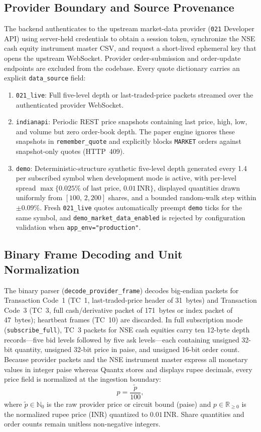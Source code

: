 \documentclass[journal,onecolumn,10pt]{IEEEtran}
\newcommand{\thinunit}[2]{#1\,\text{#2}}
\begin{document}
\subsection{Provider Boundary and Source Provenance}
The backend authenticates to the upstream market-data provider (\texttt{021} Developer API) using server-held credentials to obtain a session token, synchronize the NSE cash equity instrument master CSV, and request a short-lived ephemeral key that opens the upstream WebSocket. Provider order-submission and order-update endpoints are excluded from the codebase. Every quote dictionary carries an explicit \texttt{data\_source} field:
\begin{enumerate}
  \item \texttt{021\_live}: Full five-level depth or last-traded-price packets streamed over the authenticated provider WebSocket.
  \item \texttt{indianapi}: Periodic REST price snapshots containing last price, high, low, and volume but zero order-book depth. The paper engine ignores these snapshots in \texttt{remember\_quote} and explicitly blocks \texttt{MARKET} orders against snapshot-only quotes (HTTP~409).
  \item \texttt{demo}: Deterministic-structure synthetic five-level depth generated every \thinunit{1.4}{s} per subscribed symbol when development mode is active, with per-level spread $\max\{0.025\%\text{ of last price},\,\thinunit{0.01}{INR}\}$, displayed quantities drawn uniformly from $[100,\,2{,}200]$ shares, and a bounded random-walk step within $\pm 0.09\%$. Fresh \texttt{021\_live} quotes automatically preempt \texttt{demo} ticks for the same symbol, and \texttt{demo\_market\_data\_enabled} is rejected by configuration validation when \texttt{app\_env="production"}.
\end{enumerate}

\subsection{Binary Frame Decoding and Unit Normalization}
The binary parser (\texttt{decode\_provider\_frame}) decodes big-endian packets for Transaction Code~1 (TC~1, last-traded-price header of 31~bytes) and Transaction Code~3 (TC~3, full cash/derivative packet of 171~bytes or index packet of 47~bytes); heartbeat frames (TC~10) are discarded. In full subscription mode (\texttt{subscribe\_full}), TC~3 packets for NSE cash equities carry ten 12-byte depth records—five bid levels followed by five ask levels—each containing unsigned 32-bit quantity, unsigned 32-bit price in paise, and unsigned 16-bit order count. Because provider packets and the NSE instrument master express all monetary values in integer paise whereas Quantx stores and displays rupee decimals, every price field is normalized at the ingestion boundary:
\begin{equation}
p = \frac{\tilde{p}}{100},
\label{eq:paise}
\end{equation}
where $\tilde{p}\in\mathbb{N}_0$ is the raw provider price or circuit bound (paise) and $p\in\mathbb{R}_{\ge 0}$ is the normalized rupee price (INR) quantized to $\thinunit{0.01}{INR}$. Share quantities and order counts remain unitless non-negative integers.
\end{document}
